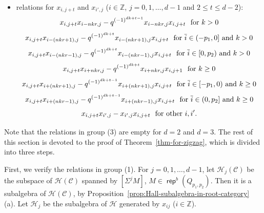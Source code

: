 \documentclass[reqno,12pt,a4paper]{amsart}
\theoremstyle{remark}
\theoremstyle{definition}
\newcommand{\opname}[1]{\operatorname{\mathsf{#1}}}
\newcommand{\rep}{\opname{rep}\nolimits}
\newcommand{\cc}{{\mathcal C}}
\newcommand{\ch}{{\mathcal H}}
\numberwithin{equation}{section}
\begin{document}
\begin{itemize}
 
\item[(3)]  relations for $x_{i,j+t}$ and $x_{i',j}$ ($i\in\mathbb{Z}$, $j=0,1,\ldots,d-1$ and $2\leq t\leq d-2$):
  \begin{equation*}
   x_{i,j+t}x_{i-nkr,j}-q^{(-1)^{dk+t-1}}x_{i-nkr,j}x_{i,j+t} ~\hbox{ for } k>0
  \end{equation*}
  \begin{equation*}
  x_{i,j+t}x_{i-(nkr+1),j}-q^{(-1)^{dk+t}}x_{i-(nkr+1),j}x_{i,j+t} ~\hbox{ for $\overline{i}\in(-p_1,0]$ and $k>0$}
  \end{equation*}
  \begin{equation*}
   x_{i,j+t}x_{i-(nkr-1),j}-q^{(-1)^{dk+t}}x_{i-(nkr-1),j}x_{i,j+t} ~\hbox{ for $\overline{i}\in[0,p_2)$ and $k>0$}
  \end{equation*}
  \begin{equation*}
    x_{i,j+t}x_{i+nkr,j}-q^{(-1)^{dk+t}}x_{i+nkr,j}x_{i,j+1} ~\hbox{ for } k\geq0
  \end{equation*}
  \begin{equation*}
    x_{i,j+t}x_{i+(nkr+1),j}-q^{(-1)^{dk+t-1}}x_{i+(nkr+1),j}x_{i,j+t} ~\hbox{ for $\overline{i}\in[-p_1,0)$ and $k\geq0$}
  \end{equation*}
  \begin{equation*}
    x_{i,j+t}x_{i+(nkr-1),j}-q^{(-1)^{dk+t-1}}x_{i+(nkr-1),j}x_{i,j+t} ~\hbox{ for $\overline{i}\in(0,p_2]$ and $k\geq0$}
  \end{equation*}
  \begin{equation*}
   x_{i,j+t}x_{i',j}-x_{i',j}x_{i,j+t} ~\hbox{ for other }i,i'.
  \end{equation*}
\end{itemize}

Note that the relations in group (3) are empty for $d=2$ and $d=3$. The rest of this section is devoted to the proof of Theorem~\ref{thm-for-zigzag}, which is divided into three steps.

First, we verify the relations in group (1). For $j=0,1,\ldots,d-1$, let $\ch_j(\cc)$ be the subspace of $\ch(\cc)$ spanned by $[\Sigma^j M]$, $M\in\rep^b(Q_{p_1,p_2})$. Then it is a subalgebra of $\ch(\cc)$, by Proposition~\ref{prop:Hall-subalgebra-in-root-category} (a). Let $\ch_j$ be the subalgebra of $\ch$ generated by $x_{ij}$ ($i\in\mathbb{Z}$).
\end{document}
